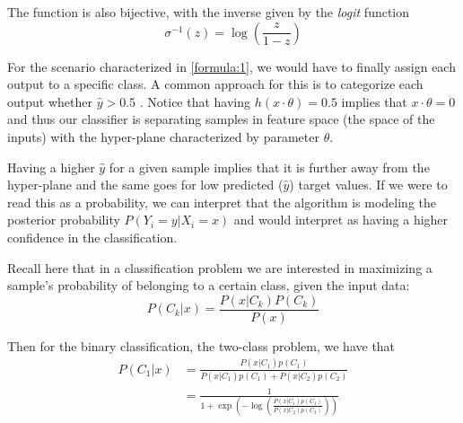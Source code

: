 The function is also bijective, with the inverse given by the \textit{logit} function
\begin{equation}
\sigma^{-1}(z) = \log \left( \frac{z}{1 - z} \right)
\label{eq:logitFunction}
\end{equation}

For the scenario characterized in \cref{formula:1}, we would have to finally assign each output to a specific class.
A common approach for this is to categorize each output whether $\hat{y} > 0.5$ \label{formula:logitThreshold}.
Notice that having $h(x \cdot \theta) = 0.5$ implies that $x \cdot \theta = 0$ and thus our classifier is separating samples in feature space (the space of the inputs) with the hyper-plane characterized by parameter $\theta$.

Having a higher $\hat{y}$ for a given sample implies that it is further away from the hyper-plane and the same goes for low predicted ($\hat{y}$) target values.
If we were to read this as a probability, we can interpret that the algorithm is modeling the posterior probability $P(Y_i = y | X_i = x)$ and would interpret as having a higher confidence in the classification.






Recall here that in a classification problem we are interested in maximizing a sample's probability of belonging to a certain class, given the input data:
\begin{equation}
P(C_k| x) = \frac{P(x|C_k)P(C_k)}{P(x)}
\end{equation}

Then for the binary classification, the two-class problem, we have that
\begin{equation}
\begin{split}
P(C_1| x) & = \frac{P(x|C_1)p(C_1) }{P(x|C_1)p(C_1) + P(x|C_2)p(C_2)} \\
& = \frac{1 }
{1 + \exp \left(- \log \left(  \frac{ P(x|C_1)p(C_1)}
{P(x|C_2)p(C_2)
} \right) \right)
}
\end{split}
\end{equation}


